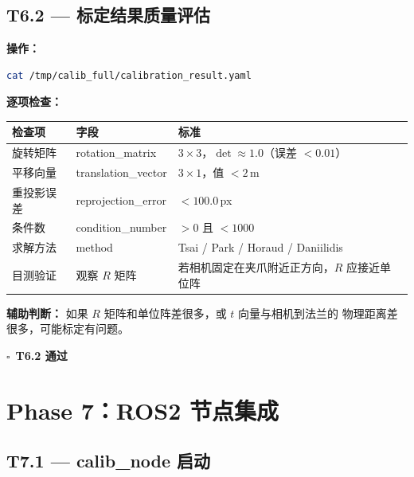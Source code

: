 \documentclass[12pt,a4paper,fontset=ubuntu]{ctexart}
\newcommand{\chkbox}{$\square$}
\begin{document}

\subsection{T6.2 — 标定结果质量评估}

\textbf{操作：}

\begin{lstlisting}[language=bash]
cat /tmp/calib_full/calibration_result.yaml
\end{lstlisting}

\textbf{逐项检查：}

\begin{center}
\begin{tabularx}{\textwidth}{@{}l>{\ttfamily}lX@{}}
  \toprule
  \textbf{检查项} & \textbf{字段} & \textbf{标准} \\
  \midrule
  旋转矩阵 & rotation\_matrix & $3\times3$，$\det \approx 1.0$（误差 $< 0.01$）\\
  平移向量 & translation\_vector & $3\times1$，值 $< 2\,\text{m}$\\
  重投影误差 & reprojection\_error & $< 100.0$\,px\\
  条件数 & condition\_number & $> 0$ 且 $< 1000$\\
  求解方法 & method & Tsai / Park / Horaud / Daniilidis\\
  目测验证 & 观察 $R$ 矩阵 & 若相机固定在夹爪附近正方向，$R$ 应接近单位阵\\
  \bottomrule
\end{tabularx}
\end{center}

\begin{warnbox}
\textbf{辅助判断：} 如果 $R$ 矩阵和单位阵差很多，或 $t$ 向量与相机到法兰的
物理距离差很多，可能标定有问题。
\end{warnbox}

\begin{center}\chkbox\ \textbf{T6.2 通过}\end{center}

\section{Phase 7：ROS2 节点集成}

\subsection{T7.1 — calib\_node 启动}
\end{document}
